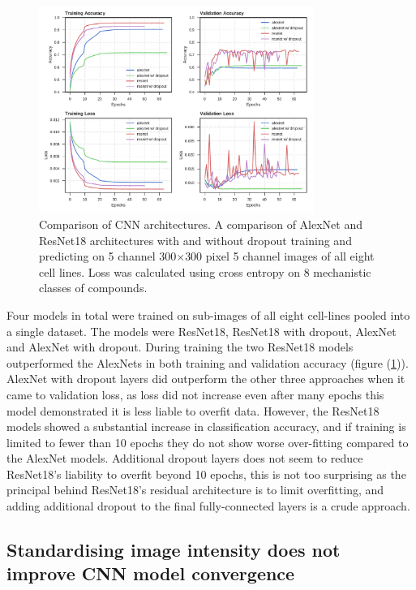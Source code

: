 \documentclass[a4paper,11pt,twoside,openright]{scrbook}
\begin{document}
\begin{figure}
    \includegraphics[width=0.8\textwidth]{ch2arch}
    \captionsetup{width=0.8\textwidth}
    \caption[Comparison of CNN architectures]{
Comparison of CNN architectures.
A comparison of AlexNet and ResNet18 architectures with and without dropout training and predicting on 5 channel 300$\times$300 pixel 5 channel images of all eight cell lines.
Loss was calculated using cross entropy on 8 mechanistic classes of compounds.}
    \label{figure:nn_arch}
\end{figure}

Four models in total were trained on sub-images of all eight cell-lines pooled into a single dataset.
The models were ResNet18, ResNet18 with dropout, AlexNet and AlexNet with dropout.
During training the two ResNet18 models outperformed the AlexNets in both training and validation accuracy (figure (\ref{figure:nn_arch})).
AlexNet with dropout layers did outperform the other three approaches when it came to validation loss, as loss did not increase even after many epochs this model demonstrated it is less liable to overfit data.
However, the ResNet18 models showed a substantial increase in classification accuracy, and if training is limited to fewer than 10 epochs they do not show worse over-fitting compared to the AlexNet models.
Additional dropout layers does not seem to reduce ResNet18's liability to overfit beyond 10 epochs, this is not too surprising as the principal behind ResNet18's residual architecture is to limit overfitting, and adding additional dropout to the final fully-connected layers is a crude approach.



\subsection{Standardising image intensity does not improve CNN model convergence}
\end{document}
